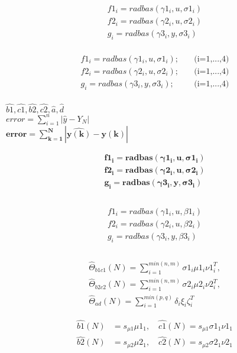 \documentclass[12pt,a4paper]{report}
\begin{document}
\begin{align*}
f1_i=radbas(\gamma1 _{i},u,\sigma 1_i)\\
f2_i=radbas(\gamma 2_i,u,\sigma 2_i)\\
g_i=radbas(\gamma3_i,y,\sigma 3_i)\\
\end{align*}

\begin{align*}
f1_i=radbas(\gamma1 _{i},u,\sigma 1_i);\quad  &\text{(i=1,...,4)}\\
f2_i=radbas(\gamma 2_i,u,\sigma 2_i); \quad   &\text{(i=1,...,4)}\\
g_i=radbas(\gamma3_i,y,\sigma 3_i); \quad     &\text{(i=1,...,4)}\\
\end{align*}

$\hat{b1},\hat{c1},\hat{b2},\hat{c2},\hat{a},\hat{d}$\\

$ error = \sum\limits_{i=1}^n\left | \hat{y}-Y_N \right |$\\

$\mathbf{error = \sum\limits_{k=1}^N|\hat{y(k)}-y(k)|}$

\begin{align*}
\mathbf{f1_i=radbas(\gamma1 _{i},u,\sigma 1_i)}\\
\mathbf{f2_i=radbas(\gamma2_i,u,\sigma 2_i)}\\
\mathbf{g_i=radbas(\gamma3_i,y,\sigma 3_i)}\\
\end{align*}\\

\begin{align*}
f1_i=radbas(\gamma1 _{i},u,\beta 1_i)\\
f2_i=radbas(\gamma2_i,u,\beta 2_i)\\
g_i=radbas(\gamma3_i,y,\beta 3_i)\\
\end{align*}\\

\begin{align*} 
\hat{\Theta }_{b1c1}(N)=\sum_{i=1}^{min(n,m)}\sigma1 _i\mu1 _i\nu1 _i^T,\\
\hat{\Theta }_{b2c2}(N)=\sum_{i=1}^{min(n,m)}\sigma2 _i\mu2 _i\nu2 _i^T,\\
\hat{\Theta }_{ad}(N)=\sum_{i=1}^{min(p,q)}\delta  _i\xi  _i\zeta  _i^T
\end{align*}

\begin{align*}
\hat{b1}(N)&= s_{\mu1} \mu1_1, \quad \hat{c1}(N)= s_{\mu1}\sigma1 _1\nu1_1\\
\hat{b2}(N)&= s_{\mu2} \mu2_1, \quad \hat{c2}(N)= s_{\mu2}\sigma2 _1\nu2_1\\
\end{align*}
\end{document}
